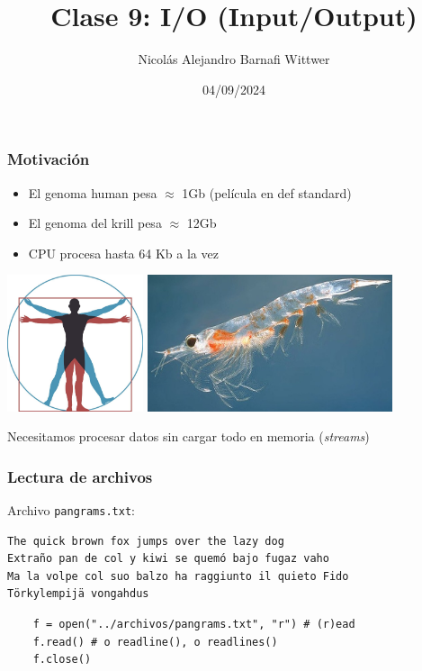 \documentclass[14pt,aspectratio=169,xcolor=dvipsnames]{beamer}
\title[short title]{Clase 9: I/O (Input/Output)}
\subtitle{}
\author[NA Barnafi] {Nicolás Alejandro Barnafi Wittwer}
\institute[UC|CMM] 
{
    Pontificia Universidad Católica de Chile \\
    Centro de Modelamiento Matemático
}
\date{04/09/2024}
\begin{document}
\begin{frame}
    \maketitle
\end{frame}
\begin{frame}\frametitle{Motivación}
    \begin{itemize}
        \item El genoma human pesa $\approx$ 1Gb (película en def standard)
        \item El genoma del krill pesa $\approx$ 12Gb
        \item CPU procesa hasta 64 Kb a la vez
    \end{itemize}
    \hspace{2cm}\includegraphics[height=4cm]{../images/vitruvio.jpg}
    \includegraphics[height=4cm]{../images/krill.jpg}

\pause Necesitamos procesar datos sin cargar todo en memoria (\emph{streams})
\end{frame}
\begin{frame}[fragile]\frametitle{Lectura de archivos}
Archivo \texttt{pangrams.txt}:
    \begin{verbatim}
The quick brown fox jumps over the lazy dog
Extraño pan de col y kiwi se quemó bajo fugaz vaho
Ma la volpe col suo balzo ha raggiunto il quieto Fido
Törkylempijä vongahdus
    \end{verbatim}

    \begin{verbatim}
    f = open("../archivos/pangrams.txt", "r") # (r)ead
    f.read() # o readline(), o readlines()
    f.close()
    \end{verbatim}
\end{frame}
\end{document}
